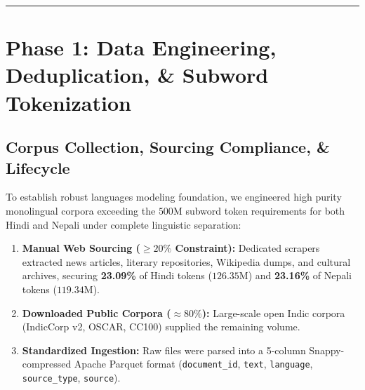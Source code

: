 \documentclass[10pt,a4paper]{article}
\begin{document}
\vspace{-8pt}
\noindent\rule{\textwidth}{0.4pt}
\vspace{-4pt}

\section{Phase 1: Data Engineering, Deduplication, \& Subword Tokenization}

\subsection{Corpus Collection, Sourcing Compliance, \& Lifecycle}
To establish robust languages modeling foundation, we engineered high purity monolingual corpora exceeding the $500\text{M}$ subword token requirements for both Hindi and Nepali under complete linguistic separation:
\begin{enumerate}
    \item \textbf{Manual Web Sourcing ($\ge 20\%$ Constraint):} Dedicated scrapers extracted news articles, literary repositories, Wikipedia dumps, and cultural archives, securing \textbf{23.09\%} of Hindi tokens ($126.35\text{M}$) and \textbf{23.16\%} of Nepali tokens ($119.34\text{M}$).
    \item \textbf{Downloaded Public Corpora ($\approx 80\%$):} Large-scale open Indic corpora (IndicCorp v2, OSCAR, CC100) supplied the remaining volume.
    \item \textbf{Standardized Ingestion:} Raw files were parsed into a 5-column Snappy-compressed Apache Parquet format (\texttt{document\_id}, \texttt{text}, \texttt{language}, \texttt{source\_type}, \texttt{source}).
\end{enumerate}
\end{document}
